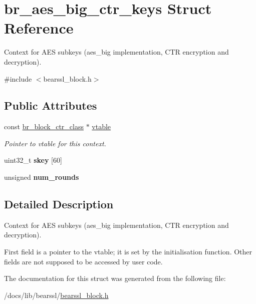\hypertarget{structbr__aes__big__ctr__keys}{}\section{br\+\_\+aes\+\_\+big\+\_\+ctr\+\_\+keys Struct Reference}
\label{structbr__aes__big__ctr__keys}


Context for A\+ES subkeys ({\ttfamily aes\+\_\+big} implementation, C\+TR encryption and decryption).  




{\ttfamily \#include $<$bearssl\+\_\+block.\+h$>$}

\subsection*{Public Attributes}
\begin{DoxyCompactItemize}
\item 
\mbox{\label{structbr__aes__big__ctr__keys_a96e7e1a5411b7c026135cc7633964740}} 
const \hyperlink{bearssl__block_8h_a8934ac58af503220bfb6e6cbc2cfb209}{br\+\_\+block\+\_\+ctr\+\_\+class} $\ast$ \hyperlink{structbr__aes__big__ctr__keys_a96e7e1a5411b7c026135cc7633964740}{vtable}
\begin{DoxyCompactList}\small\item\em Pointer to vtable for this context. \end{DoxyCompactList}\item 
\mbox{\label{structbr__aes__big__ctr__keys_aa1af2ba0ad71cfc68fc3016ecad85ddd}} 
uint32\+\_\+t {\bfseries skey} \mbox{[}60\mbox{]}
\item 
\mbox{\label{structbr__aes__big__ctr__keys_a93ed2de89d16ba833576c8ac4bb26c1f}} 
unsigned {\bfseries num\+\_\+rounds}
\end{DoxyCompactItemize}


\subsection{Detailed Description}
Context for A\+ES subkeys ({\ttfamily aes\+\_\+big} implementation, C\+TR encryption and decryption). 

First field is a pointer to the vtable; it is set by the initialisation function. Other fields are not supposed to be accessed by user code. 

The documentation for this struct was generated from the following file\+:\begin{DoxyCompactItemize}
\item 
/docs/lib/bearssl/\hyperlink{bearssl__block_8h}{bearssl\+\_\+block.\+h}\end{DoxyCompactItemize}
